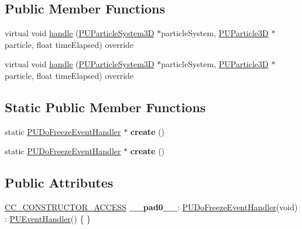 \subsection*{Public Member Functions}
\begin{DoxyCompactItemize}
\item 
virtual void \hyperlink{classPUDoFreezeEventHandler_a0203ad7344e56fb7c6676222973da0cc}{handle} (\hyperlink{classPUParticleSystem3D}{P\+U\+Particle\+System3D} $\ast$particle\+System, \hyperlink{structPUParticle3D}{P\+U\+Particle3D} $\ast$particle, float time\+Elapsed) override
\item 
virtual void \hyperlink{classPUDoFreezeEventHandler_a961d110b3aa250a3a2d9d95a049aa299}{handle} (\hyperlink{classPUParticleSystem3D}{P\+U\+Particle\+System3D} $\ast$particle\+System, \hyperlink{structPUParticle3D}{P\+U\+Particle3D} $\ast$particle, float time\+Elapsed) override
\end{DoxyCompactItemize}
\subsection*{Static Public Member Functions}
\begin{DoxyCompactItemize}
\item 
\mbox{\label{classPUDoFreezeEventHandler_ac353c9e97679e23a4d10982db70a26e1}} 
static \hyperlink{classPUDoFreezeEventHandler}{P\+U\+Do\+Freeze\+Event\+Handler} $\ast$ {\bfseries create} ()
\item 
\mbox{\label{classPUDoFreezeEventHandler_a0ca9c3a523b217bda2d7f48052d1ef18}} 
static \hyperlink{classPUDoFreezeEventHandler}{P\+U\+Do\+Freeze\+Event\+Handler} $\ast$ {\bfseries create} ()
\end{DoxyCompactItemize}
\subsection*{Public Attributes}
\begin{DoxyCompactItemize}
\item 
\mbox{\label{classPUDoFreezeEventHandler_afdd84c876c27da15bfa4f1e482c84c57}} 
\hyperlink{_2cocos2d_2cocos_2base_2ccConfig_8h_a25ef1314f97c35a2ed3d029b0ead6da0}{C\+C\+\_\+\+C\+O\+N\+S\+T\+R\+U\+C\+T\+O\+R\+\_\+\+A\+C\+C\+E\+SS} {\bfseries \+\_\+\+\_\+pad0\+\_\+\+\_\+}\+: \hyperlink{classPUDoFreezeEventHandler}{P\+U\+Do\+Freeze\+Event\+Handler}(void) \+: \hyperlink{classPUEventHandler}{P\+U\+Event\+Handler}() \{ \}
\end{DoxyCompactItemize}
